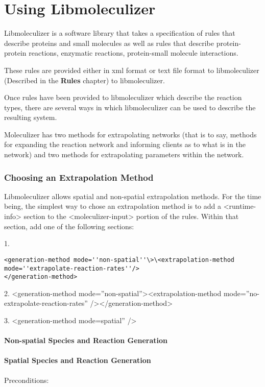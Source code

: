 \chapter{Using Libmoleculizer}
Libmoleculizer is a software library that takes a specification of
rules that describe proteins and small molecules as well as rules that
describe protein-protein reactions, enzymatic reactions, protein-small
molecule interactions.  

These rules are provided either in xml format or text file format to
libmoleculizer (Described in the {\bf Rules} chapter) to
libmoleculizer. 

Once rules have been provided to libmoleculizer which describe the
reaction types, there are several ways in which libmoleculizer can be
used to describe the resulting system.  

Moleculizer has two methods for extrapolating networks (that is to
say, methods for expanding the reaction network and informing clients
as to what is in the network) and two methods for extrapolating
parameters within the network.  

\subsection{Choosing an Extrapolation Method}

Libmoleculizer allows spatial and non-spatial extrapolation methods.
For the time being, the simplest way to chose an extrapolation method
is to add a <runtime-info> section to the <moleculizer-input> portion
of the rules.  Within that section, add one of the following sections: 

1.
\begin{verbatim}
<generation-method mode=''non-spatial''\>\<extrapolation-method
mode=''extrapolate-reaction-rates''/>
</generation-method>
\end{verbatim}


2.
<generation-method mode=''non-spatial''><extrapolation-method
mode=''no-extrapolate-reaction-rates'' /></generation-method>

3.
<generation-method mode=spatial'' />


\subsubsection{Non-spatial Species and Reaction Generation}
\subsubsection{Spatial Species and Reaction Generation}

Preconditions:



